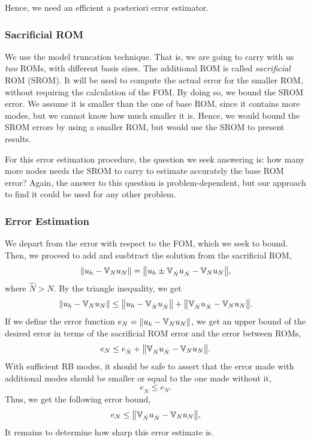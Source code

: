 \documentclass[../../thesis.tex]{subfiles}
\newcommand{\rbV}{\ensuremath{\mathbb{V}}}
\begin{document}
Hence, we need an efficient a posteriori error estimator.

\subsubsection{Sacrificial ROM}
We use the model truncation technique.
That is, we are going to carry with us \textit{two} ROMs,
with different basis sizes.
The additional ROM is called \textit{sacrificial} ROM (SROM).
It will be used to compute the actual error for the smaller ROM,
without requiring the calculation of the FOM.
By doing so, we bound the SROM error.
We assume it is smaller than the one of base ROM, since it contains more modes,
but we cannot know how much smaller it is.
Hence, we would bound the SROM errors by using a smaller ROM, 
but would use the SROM to present results.

For this error estimation procedure, the question we seek answering is:
how many more nodes needs the SROM to carry to estimate accurately the base ROM error?
Again, the answer to this question is problem-dependent,
but our approach to find it could be used for any other problem.

\subsubsection{Error Estimation}
We depart from the error with respect to the FOM, which we seek to bound.
Then, we proceed to add and susbtract the solution from the sacrificial ROM,
\begin{equation}
    \norm{u_h - \rbV_{N} u_N} = \norm{u_h \pm \rbV_{\hat{N}} u_{\hat{N}} - \rbV_{N} u_{N}},
\end{equation}
where $\hat{N} > N$. 
By the triangle inequality, we get
\begin{equation}
    \norm{u_h - \rbV_{N} u_N} \leq \norm{u_h - \rbV_{\hat{N}} u_{\hat{N}}} + \norm{\rbV_{\hat{N}} u_{\hat{N}} - \rbV_{N} u_{N}}.
\end{equation}
If we define the error function $e_N = \norm{u_h - \rbV_{N} u_N}$, 
we get an upper bound of the desired error in terms of the sacrificial ROM error and the error between ROMs,
\begin{equation}
    e_N \leq e_{\hat{N}} + \norm{\rbV_{\hat{N}} u_{\hat{N}} - \rbV_{N} u_{N}}.
\end{equation}
With sufficient RB modes, it should be safe to assert that the error made 
with additional modes should be smaller or equal to the one made without it,
\begin{equation}
    e_{\hat{N}} \leq e_{N}.
\end{equation}
Thus, we get the following error bound,
\begin{equation}
    e_N \leq \norm{\rbV_{\hat{N}} u_{\hat{N}} - \rbV_{N} u_{N}},
\end{equation}
It remains to determine how sharp this error estimate is.
\end{document}
